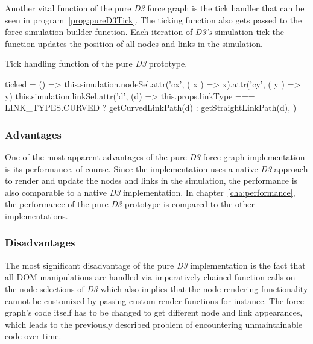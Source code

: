 Another vital function of the pure \emph{D3} force graph is the tick handler that can be seen in program~\ref{prog:pureD3Tick}. The ticking function also gets passed to the force simulation builder function. Each iteration of \emph{D3's} simulation tick the function updates the position of all nodes and links in the simulation.

\begin{program}[th]
\caption{Tick handling function of the pure \emph{D3} prototype.}
\label{prog:pureD3Tick}
\begin{JsCode}
ticked = () => {
  this.simulation.nodeSel.attr('cx', ({ x }) => x).attr('cy', ({ y }) => y)
  this.simulation.linkSel.attr('d', (d) =>
    this.props.linkType === LINK_TYPES.CURVED ? getCurvedLinkPath(d) : getStraightLinkPath(d),
  )
}
\end{JsCode}
\end{program}

\subsubsection{Advantages}

One of the most apparent advantages of the pure \emph{D3} force graph implementation is its performance, of course. Since the implementation uses a native \emph{D3} approach to render and update the nodes and links in the simulation, the performance is also comparable to a native \emph{D3} implementation. In chapter~\ref{cha:performance}, the performance of the pure \emph{D3} prototype is compared to the other implementations.

\subsubsection{Disadvantages}

The most sig\-nifi\-cant disadvantage of the pure \emph{D3} implementation is the fact that all DOM manipulations are handled via imperatively chained function calls on the node selections of \emph{D3} which also implies that the node rendering functionality cannot be customized by passing custom render functions for instance. The force graph's code itself has to be changed to get different node and link appearances, which leads to the previously described problem of encountering unmaintainable code over time.


